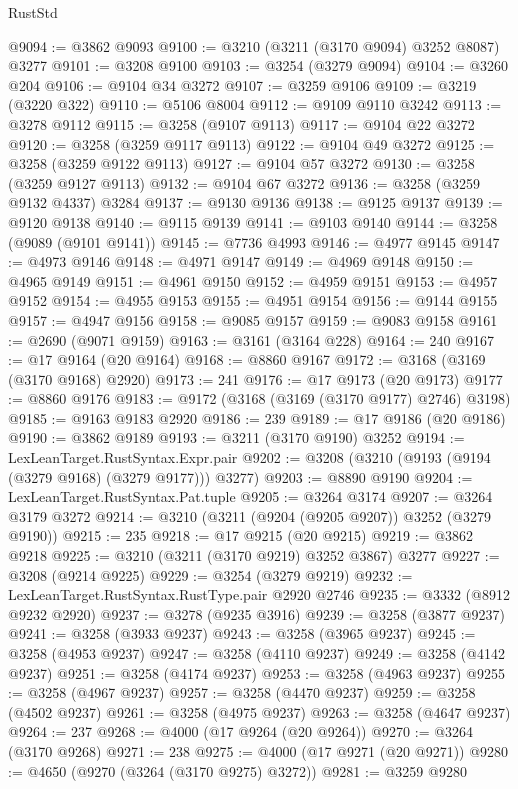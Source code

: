 \begin{lexlean}{RustStd}
\begin{coremodule}
@9094 := @3862 @9093
@9100 := @3210 (@3211 (@3170 @9094) @3252 @8087) @3277
@9101 := @3208 @9100
@9103 := @3254 (@3279 @9094)
@9104 := @3260 @204
@9106 := @9104 @34 @3272
@9107 := @3259 @9106
@9109 := @3219 (@3220 @322)
@9110 := @5106 @8004
@9112 := @9109 @9110 @3242
@9113 := @3278 @9112
@9115 := @3258 (@9107 @9113)
@9117 := @9104 @22 @3272
@9120 := @3258 (@3259 @9117 @9113)
@9122 := @9104 @49 @3272
@9125 := @3258 (@3259 @9122 @9113)
@9127 := @9104 @57 @3272
@9130 := @3258 (@3259 @9127 @9113)
@9132 := @9104 @67 @3272
@9136 := @3258 (@3259 @9132 @4337) @3284
@9137 := @9130 @9136
@9138 := @9125 @9137
@9139 := @9120 @9138
@9140 := @9115 @9139
@9141 := @9103 @9140
@9144 := @3258 (@9089 (@9101 @9141))
@9145 := @7736 @4993
@9146 := @4977 @9145
@9147 := @4973 @9146
@9148 := @4971 @9147
@9149 := @4969 @9148
@9150 := @4965 @9149
@9151 := @4961 @9150
@9152 := @4959 @9151
@9153 := @4957 @9152
@9154 := @4955 @9153
@9155 := @4951 @9154
@9156 := @9144 @9155
@9157 := @4947 @9156
@9158 := @9085 @9157
@9159 := @9083 @9158
@9161 := @2690 (@9071 @9159)
@9163 := @3161 (@3164 @228)
@9164 := 240
@9167 := @17 @9164 (@20 @9164)
@9168 := @8860 @9167
@9172 := @3168 (@3169 (@3170 @9168) @2920)
@9173 := 241
@9176 := @17 @9173 (@20 @9173)
@9177 := @8860 @9176
@9183 := @9172 (@3168 (@3169 (@3170 @9177) @2746) @3198)
@9185 := @9163 @9183 @2920
@9186 := 239
@9189 := @17 @9186 (@20 @9186)
@9190 := @3862 @9189
@9193 := @3211 (@3170 @9190) @3252
@9194 := LexLeanTarget.RustSyntax.Expr.pair
@9202 := @3208 (@3210 (@9193 (@9194 (@3279 @9168) (@3279 @9177))) @3277)
@9203 := @8890 @9190
@9204 := LexLeanTarget.RustSyntax.Pat.tuple
@9205 := @3264 @3174
@9207 := @3264 @3179 @3272
@9214 := @3210 (@3211 (@9204 (@9205 @9207)) @3252 (@3279 @9190))
@9215 := 235
@9218 := @17 @9215 (@20 @9215)
@9219 := @3862 @9218
@9225 := @3210 (@3211 (@3170 @9219) @3252 @3867) @3277
@9227 := @3208 (@9214 @9225)
@9229 := @3254 (@3279 @9219)
@9232 := LexLeanTarget.RustSyntax.RustType.pair @2920 @2746
@9235 := @3332 (@8912 @9232 @2920)
@9237 := @3278 (@9235 @3916)
@9239 := @3258 (@3877 @9237)
@9241 := @3258 (@3933 @9237)
@9243 := @3258 (@3965 @9237)
@9245 := @3258 (@4953 @9237)
@9247 := @3258 (@4110 @9237)
@9249 := @3258 (@4142 @9237)
@9251 := @3258 (@4174 @9237)
@9253 := @3258 (@4963 @9237)
@9255 := @3258 (@4967 @9237)
@9257 := @3258 (@4470 @9237)
@9259 := @3258 (@4502 @9237)
@9261 := @3258 (@4975 @9237)
@9263 := @3258 (@4647 @9237)
@9264 := 237
@9268 := @4000 (@17 @9264 (@20 @9264))
@9270 := @3264 (@3170 @9268)
@9271 := 238
@9275 := @4000 (@17 @9271 (@20 @9271))
@9280 := @4650 (@9270 (@3264 (@3170 @9275) @3272))
@9281 := @3259 @9280

\end{coremodule}
\end{lexlean}
